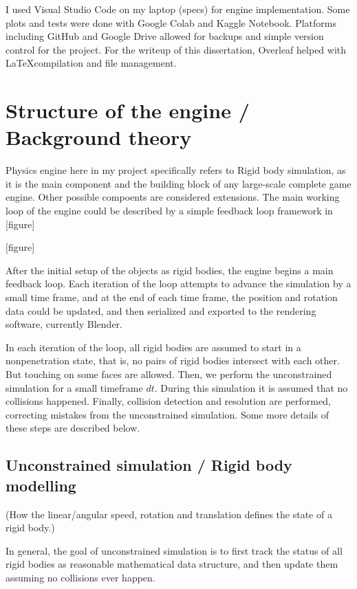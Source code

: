 \documentclass[runningheads]{llncs}
\begin{document}
I used Visual Studio Code on my laptop (specs) for engine implementation. Some plots and tests were done with Google Colab and Kaggle Notebook. Platforms including GitHub and Google Drive allowed for backups and simple version control for the project. For the writeup of this dissertation, Overleaf helped with \LaTeX compilation and file management.

\section{Structure of the engine / Background theory}

Physics engine here in my project specifically refers to Rigid body simulation, as it is the main component and the building block of any large-scale complete game engine. Other possible compoents are considered extensions. The main working loop of the engine could be described by a simple feedback loop framework in [figure]

[figure]

After the initial setup of the objects as rigid bodies, the engine begins a main feedback loop. Each iteration of the loop attempts to advance the simulation by a small time frame, and at the end of each time frame, the position and rotation data could be updated, and then serialized and exported to the rendering software, currently Blender.

In each iteration of the loop, all rigid bodies are assumed to start in a nonpenetration state, that is, no pairs of rigid bodies intersect with each other. But touching on some faces are allowed. Then, we perform the unconstrained simulation for a small timeframe $dt$. During this simulation it is assumed that no collisions happened. Finally, collision detection and resolution are performed, correcting mistakes from the unconstrained simulation. Some more details of these steps are described below.

\subsection{Unconstrained simulation / Rigid body modelling}

(How the linear/angular speed, rotation and translation defines the state of a rigid body.)

In general, the goal of unconstrained simulation is to first track the status of all rigid bodies as reasonable mathematical data structure, and then update them assuming no collisions ever happen.
\end{document}
